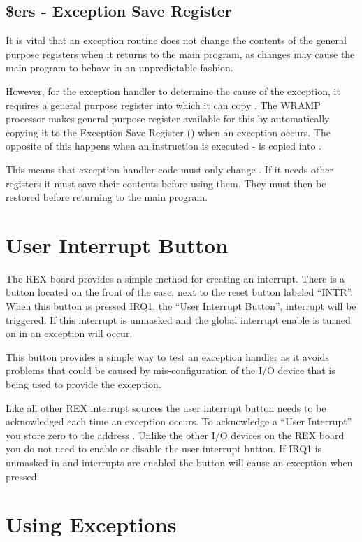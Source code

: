\subsection{\$ers - Exception Save Register}

It is vital that an exception routine does not change the contents of the
general purpose registers when it returns to the main program, as changes
may cause the main program to behave in an unpredictable fashion.

However, for the exception handler to determine the cause of the exception,
it requires a general purpose register into which it can copy
. The WRAMP processor makes general purpose register 
available for this by automatically copying it to the Exception Save
Register () when an exception occurs. The opposite of this happens
when an  instruction is executed -  is copied into
.

This means that exception handler code must only change .  If
it needs other registers it must save their contents before using
them.  They must then be restored before returning to the main
program.

\section{User Interrupt Button}

The REX board provides a simple method for creating an
interrupt. There is a button located on the front of the case, next to
the reset button labeled ``INTR''. When this button is pressed IRQ1,
the ``User Interrupt Button'', interrupt will be triggered. If this
interrupt is unmasked and the global interrupt enable is turned on in
 an exception will occur.

This button provides a simple way to test an exception handler as it
avoids problems that could be caused by mis-configuration of the I/O
device that is being used to provide the exception.

Like all other REX interrupt sources the user interrupt button needs
to be acknowledged each time an exception occurs. To acknowledge a
``User Interrupt'' you store zero to the address
. Unlike the other I/O devices on the REX board you do
not need to enable or disable the user interrupt button. If IRQ1 is
unmasked in  and interrupts are enabled the button
will cause an exception when pressed.

\section{Using Exceptions}

